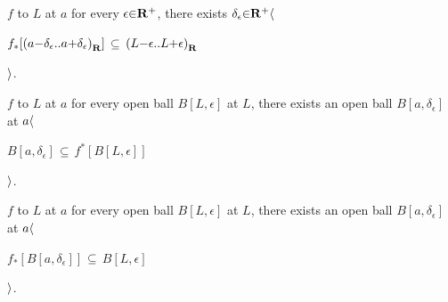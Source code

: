    $f$  to $L$ at $a$  for every $\epsilon \p\in \R^+$, there exists $\delta_\epsilon \p\in \R^+ \a\langle$ \par
      \hs\hs\hs $f_*[\a(a\p-\delta_\epsilon \a{..} a\p+\delta_\epsilon\a)_\R]$ $\p\subseteq$ $\a(L\p-\epsilon \a{..} L\p+\epsilon\a)_\R$ \par
    \hs\hs $\a\rangle$. \par

   $f$  to $L$ at $a$  for every open ball $B[L,\epsilon]$ at $L$, there exists an open ball $B[a,\delta_\epsilon]$ at $a \a\langle$ \par
      \hs\hs\hs $B[a,\delta_\epsilon]$ $\p\subseteq$ $f^*[B[L,\epsilon]]$ \par
    \hs\hs $\a\rangle$. \par
   $f$  to $L$ at $a$  for every open ball $B[L,\epsilon]$ at $L$, there exists an open ball $B[a,\delta_\epsilon]$ at $a \a\langle$ \par
      \hs\hs\hs $f_*[B[a,\delta_\epsilon]]$ $\p\subseteq$ $B[L,\epsilon]$ \par
    \hs\hs $\a\rangle$. \par

